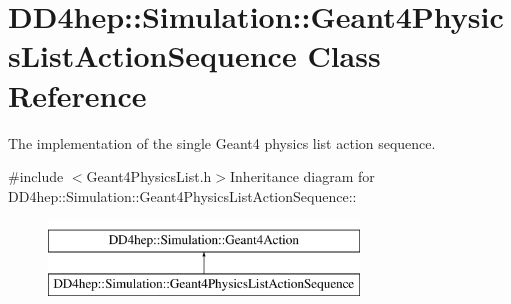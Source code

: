 \hypertarget{class_d_d4hep_1_1_simulation_1_1_geant4_physics_list_action_sequence}{
\section{DD4hep::Simulation::Geant4PhysicsListActionSequence Class Reference}
\label{class_d_d4hep_1_1_simulation_1_1_geant4_physics_list_action_sequence}
}


The implementation of the single Geant4 physics list action sequence.  


{\ttfamily \#include $<$Geant4PhysicsList.h$>$}Inheritance diagram for DD4hep::Simulation::Geant4PhysicsListActionSequence::\begin{figure}[H]
\begin{center}
\leavevmode
\includegraphics[height=2cm]{class_d_d4hep_1_1_simulation_1_1_geant4_physics_list_action_sequence}
\end{center}
\end{figure}
